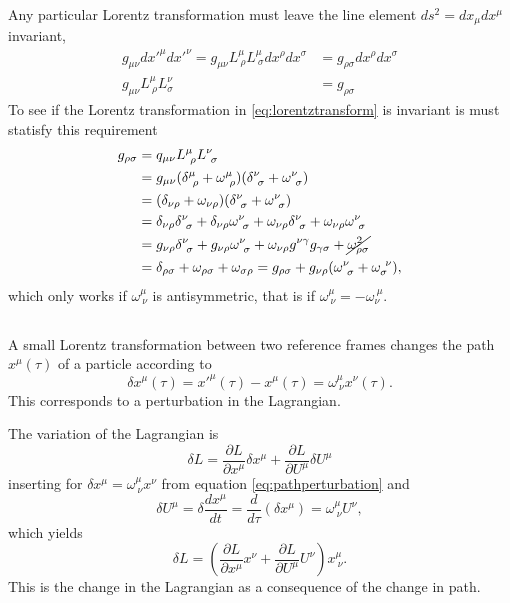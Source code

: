 \documentclass[11pt]{amsart}
\begin{document}
Any particular Lorentz transformation must leave the line element $ds^2 = dx_{\mu}dx^{\mu}$ invariant,
\begin{align*}
g_{\mu\nu}dx'^{\mu}dx'^{\nu} = g_{\mu\nu} L^\mu_{\ \rho} L^\mu_{\ \sigma}dx^\rho dx^\sigma 
											&= g_{\rho\sigma}dx^\rho dx^\sigma \\
g_{\mu\nu}L^{\mu}_{\ \rho}L^{\nu}_{\sigma}	&= g_{\rho\sigma}
\end{align*}
To see if the Lorentz transformation in \ref{eq:lorentztransform} is invariant is must statisfy this requirement
\begin{align*}
g_{\rho\sigma}  &= q_{\mu\nu}L^{\mu}_{\ \rho}L^{\nu}_{\ \sigma} \\
			&= g_{\mu\nu}(\delta^{\mu}_{\ \rho} + \omega^{\mu}_{\ \rho})(\delta^{\nu}_{\ \sigma} + \omega^{\nu}_{\ \sigma}) \\
			&= (\delta_{\nu\rho} + \omega_{\nu\rho})(\delta^{\nu}_{\ \sigma} + \omega^{\nu}_{\ \sigma}) \\
			&= \delta_{\nu\rho}\delta^{\nu}_{\ \sigma} + \delta_{\nu\rho}\omega^{\nu}_{\ \sigma} + \omega_{\nu\rho}\delta^{\nu}_{\ \sigma} + \omega_{\nu\rho}\omega^{\nu}_{\ \sigma} \\
			&= g_{\nu\rho}\delta^{\nu}_{\ \sigma} + g_{\nu\rho}\omega^{\nu}_{\ \sigma} + \omega_{\nu\rho}g^{\nu\gamma} g_{\gamma\sigma} + \cancel{\omega^2_{\rho\sigma}} \\
			& = \delta_{\rho\sigma} + \omega_{\rho\sigma} + \omega_{\sigma\rho} = g_{\rho\sigma} + g_{\nu\rho}(\omega^{\nu}_{\ \sigma} + \omega_{\sigma}^{\ \nu}),
\end{align*}
which only works if $\omega^{\mu}_{\ \nu}$ is antisymmetric, that is if $\omega^{\mu}_{\ \nu} = -\omega_{\nu}^{\ \mu}$.

\subsection{}
A small Lorentz transformation between two reference frames changes the path $x^\mu(\tau)$ of a particle according to
\begin{equation}
\label{eq:pathperturbation}
\delta x^\mu(\tau) = x'^\mu(\tau) - x^\mu(\tau) = \omega^\mu_{\ \nu}x^\nu(\tau).
\end{equation}
This corresponds to a perturbation in the Lagrangian.

The variation of the Lagrangian is
\begin{equation*}
\delta L = \frac{\partial L}{\partial x^\mu} \delta x^\mu + \frac{\partial L}{\partial U^\mu} \delta U^\mu
\end{equation*}
inserting for $\delta x^\mu = \omega^\mu_{\ \nu} x^\nu$ from equation \ref{eq:pathperturbation} and 
\begin{equation*}
\delta U^\mu = \delta \frac{d x^\mu}{d t} = \frac{d}{d\tau}(\delta x^\mu) = \omega^\mu_{\ \nu}U^\nu, 
\end{equation*} 
which yields
\begin{equation}
\label{eq:lagrangeperturbartion}
\delta L = \left(\frac{\partial L}{\partial x^\mu}x^\nu + \frac{\partial L}{\partial U^\mu}U^\nu \right)x^\mu_{\ \nu}.
\end{equation}
This is the change in the Lagrangian as a consequence of the change in path.
\end{document}
